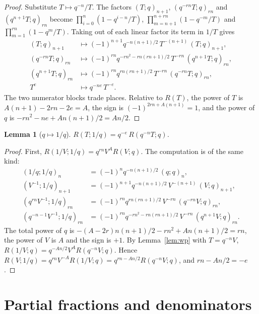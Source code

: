 \documentclass[11pt]{amsart}
\newtheorem{lemma}[theorem]{Lemma}
\theoremstyle{definition}
\theoremstyle{remark}
\numberwithin{equation}{section}
\begin{document}
\begin{proof}
Substitute $T\mapsto q^{-n}/T$. The factors $(T;q)_{n+1}$, $(q^{-rn}T;q)_{rn}$ and $(q^{n+1}T;q)_{rn}$ become
$\prod_{i=0}^n(1-q^{i-n}/T)$, $\prod_{m=n+1}^{n+rn}(1-q^{-m}/T)$ and $\prod_{m=1}^{rn}(1-q^{m}/T)$. Taking out of each
linear factor its term in $1/T$ gives
\begin{align*}
(T;q)_{n+1}&\mapsto(-1)^{n+1}q^{-n(n+1)/2}\,T^{-(n+1)}\,(T;q)_{n+1},\\
(q^{-rn}T;q)_{rn}&\mapsto(-1)^{rn}q^{-rn^2-rn(rn+1)/2}\,T^{-rn}\,(q^{n+1}T;q)_{rn},\\
(q^{n+1}T;q)_{rn}&\mapsto(-1)^{rn}q^{rn(rn+1)/2}\,T^{-rn}\,(q^{-rn}T;q)_{rn},\\
T^e&\mapsto q^{-ne}\,T^{-e}.
\end{align*}
The two numerator blocks trade places. Relative to $R(T)$, the power of $T$ is $A(n+1)-2rn-2e=A$, the sign is
$(-1)^{2rn+A(n+1)}=1$, and the power of $q$ is $-rn^2-ne+An(n+1)/2=An/2$.
\end{proof}

\begin{lemma}[$q\mapsto1/q$]\label{lem:inv}
$R(T;1/q)=q^{-e}\,R(q^{-n}T;q)$.
\end{lemma}

\begin{proof}
First, $R(1/V;1/q)=q^{rn}V^AR(V;q)$. The computation is of the same kind:
\begin{align*}
(1/q;1/q)_n&=(-1)^nq^{-n(n+1)/2}\,(q;q)_n,\\
(V^{-1};1/q)_{n+1}&=(-1)^{n+1}q^{-n(n+1)/2}\,V^{-(n+1)}\,(V;q)_{n+1},\\
(q^{rn}V^{-1};1/q)_{rn}&=(-1)^{rn}q^{rn(rn+1)/2}\,V^{-rn}\,(q^{-rn}V;q)_{rn},\\
(q^{-n-1}V^{-1};1/q)_{rn}&=(-1)^{rn}q^{-rn^2-rn(rn+1)/2}\,V^{-rn}\,(q^{n+1}V;q)_{rn}.
\end{align*}
The total power of $q$ is $-(A-2r)n(n+1)/2-rn^2+An(n+1)/2=rn$, the power of $V$ is $A$ and the sign is $+1$. By
Lemma~\ref{lem:wp} with $T=q^{-n}V$, $R(1/V;q)=q^{-An/2}V^AR(q^{-n}V;q)$. Hence
$R(V;1/q)=q^{rn}V^{-A}R(1/V;q)=q^{rn-An/2}R(q^{-n}V;q)$, and $rn-An/2=-e$.
\end{proof}

\section{Partial fractions and denominators}\label{sec:pf}
\end{document}
